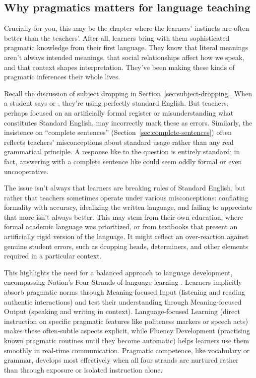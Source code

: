\subsection{Why pragmatics matters for language teaching}

Crucially for you, this may be the chapter where the learners' instincts are often better than the teachers'. After all, learners bring with them sophisticated pragmatic knowledge from their first language. They know that literal meanings aren't always intended meanings, that social relationships affect how we speak, and that context shapes interpretation. They've been making these kinds of pragmatic inferences their whole lives.

Recall the discussion of subject dropping in Section~\ref{sec:subject-dropping}. When a student says  or , they're using perfectly standard English. But teachers, perhaps focused on an artificially formal register or misunderstanding what constitutes Standard English, may incorrectly mark these as errors. Similarly, the insistence on \enquote{complete sentences} (Section~\ref{sec:complete-sentences}) often reflects teachers' misconceptions about standard usage rather than any real grammatical principle. A response like  to the question  is entirely standard; in fact, answering with a complete sentence like  could seem oddly formal or even uncooperative.

The issue isn't always that learners are breaking rules of Standard English, but rather that teachers sometimes operate under various misconceptions: conflating formality with accuracy, idealizing the written language, and failing to appreciate that more isn't always better. This may stem from their own education, where formal academic language was prioritized, or from textbooks that present an artificially rigid version of the language. It might reflect an over-reaction against genuine student errors, such as dropping heads, determiners, and other elements required in a particular context.

This highlights the need for a balanced approach to language development, encompassing Nation's Four Strands of language learning \citep{Nation2007FourStrands}. Learners implicitly absorb pragmatic norms through Meaning-focused Input (listening and reading authentic interactions) and test their understanding through Meaning-focused Output (speaking and writing in context). Language-focused Learning (direct instruction on specific pragmatic features like politeness markers or speech acts) makes these often-subtle aspects explicit, while Fluency Development (practising known pragmatic routines until they become automatic) helps learners use them smoothly in real-time communication. Pragmatic competence, like vocabulary or grammar, develops most effectively when all four strands are nurtured rather than through exposure or isolated instruction alone.


